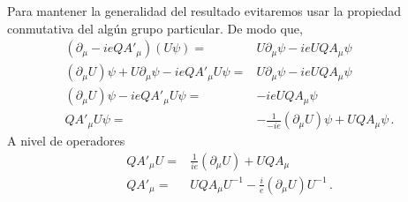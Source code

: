 \begin{frame}
Para mantener la generalidad del resultado evitaremos usar la propiedad conmutativa del algún grupo particular. De modo que,
\begin{align}
    \left( \partial_{\mu}-ieQ A'_{\mu} \right)\left(U\psi\right) =&U\partial_{\mu}\psi-ie  UQA_{\mu}\psi \nonumber\\
    \left( \partial_{\mu}U \right)\psi+U \partial_{\mu}\psi -ie QA'_{\mu}U\psi =&U\partial_{\mu}\psi-ie  U QA_{\mu}\psi \nonumber\\
    \left( \partial_{\mu}U \right)\psi -ie QA'_{\mu}U\psi =&-ie  U QA_{\mu}\psi \nonumber\\
      QA'_{\mu}U\psi =&- \frac{1}{-ie}\left( \partial_{\mu}U \right)\psi + U QA_{\mu}\psi \,.
\end{align}
A nivel de operadores
\begin{align}
  \label{eq:u1gt}
      QA'_{\mu}U =&\frac{1}{ie}\left( \partial_{\mu}U \right) + U QA_{\mu} \nonumber\\
      QA'_{\mu} =& U QA_{\mu} U^{-1}-\frac{i}{e}\left( \partial_{\mu}U \right)U^{-1}\,.
\end{align}



\end{frame}
